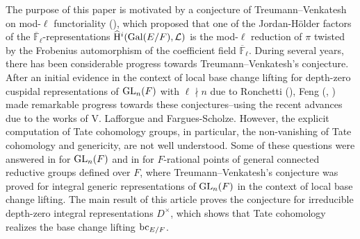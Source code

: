 \documentclass[10pt, reqno]{amsart}
\theoremstyle{plain}
\numberwithin{equation}{section}
\begin{document}
The purpose of this paper is motivated by a conjecture of Treumann--Venkatesh on mod-$\ell$ functoriality (\cite[Conjecture 6.3]{TV_paper}), which proposed that one of the Jordan-Hölder factors of the $\overline{\mathbb{F}}_\ell$-representations $\widehat{\rm H}^i({\rm Gal}(E/F),\mathcal{L})$ is the mod-$\ell$ reduction of $\pi$ twisted by the Frobenius automorphism of the coefficient field $\overline{\mathbb{F}}_\ell$. During several years, there has been considerable progress towards Treumann--Venkatesh's conjecture. After an initial evidence in the context of local base change lifting for depth-zero cuspidal representations of ${\rm GL}_n(F)$ with $\ell\nmid n$ due to Ronchetti (\cite{Ronchetti_BC}), Feng (\cite{feng2023modular}, \cite{feng2024smith}) made remarkable progress towards these conjectures--using the recent advances due to the works of V. Lafforgue and Fargues-Scholze. However, the
explicit computation of Tate cohomology groups, in particular, the non-vanishing of Tate cohomology and genericity, are not well
understood. Some of these questions were answered in \cite{nadimpalli2024tate} for ${\rm GL}_n(F)$ and in \cite{dhar2025jacquet} for $F$-rational points of general connected reductive groups defined over $F$, where Treumann--Venkatesh's conjecture was proved for integral generic representations of ${\rm GL}_n(F)$ in the context of local base change lifting. The main result of this article proves the conjecture for irreducible depth-zero integral representations $D^\times$, which shows that Tate cohomology realizes the base change lifting ${\rm bc}_{E/F}$.
\end{document}
